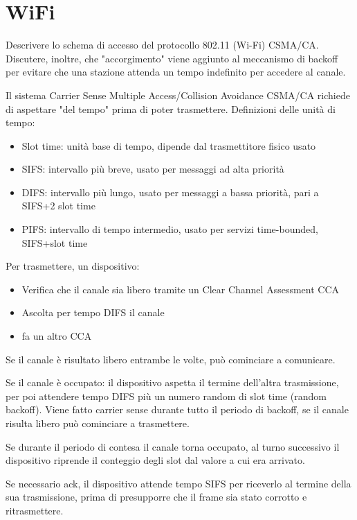 \section{WiFi}

\begin{questions}
    \question Descrivere lo schema di accesso del protocollo 802.11 (Wi-Fi) CSMA/CA. Discutere, inoltre, che "accorgimento" viene aggiunto al meccanismo di backoff per evitare che una stazione attenda un tempo indefinito per accedere al canale.
    
    \begin{solution}
        Il sistema Carrier Sense Multiple Access/Collision Avoidance CSMA/CA richiede di aspettare "del tempo" prima di poter trasmettere. Definizioni delle unità di tempo: 
        \begin{itemize}
            \item Slot time: unità base di tempo, dipende dal trasmettitore fisico usato 
            
            \item SIFS: intervallo più breve, usato per messaggi ad alta priorità
            
            \item DIFS: intervallo più lungo, usato per messaggi a bassa priorità, pari a SIFS+2 slot time
            
            \item PIFS: intervallo di tempo intermedio, usato per servizi time-bounded, SIFS+slot time
        \end{itemize}
        
        Per trasmettere, un dispositivo: 
        \begin{itemize}
            \item Verifica che il canale sia libero tramite un Clear Channel Assessment CCA
            
            \item Ascolta per tempo DIFS il canale 
            
            \item fa un altro CCA 
        \end{itemize}
        Se il canale è risultato libero entrambe le volte, può cominciare a comunicare.
        
        Se il canale è occupato: il dispositivo aspetta il termine dell'altra trasmissione, per poi attendere tempo DIFS più un numero random di slot time (random backoff). Viene fatto carrier sense durante tutto il periodo di backoff, se il canale risulta libero può cominciare a trasmettere.
        
        Se durante il periodo di contesa il canale torna occupato, al turno successivo il dispositivo riprende il conteggio degli slot dal valore a cui era arrivato.
        
        Se necessario ack, il dispositivo attende tempo SIFS per riceverlo al termine della sua trasmissione, prima di presupporre che il frame sia stato corrotto e ritrasmettere. 
    \end{solution}
\end{questions}